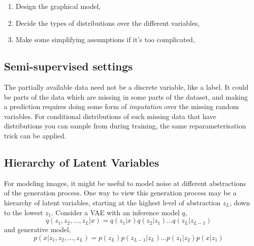 \documentclass{article}
\begin{document}
\begin{enumerate}
\item Design the graphical model,
\item Decide the types of distributions over the different variables,
\item Make some simplifying assumptions if it's too complicated,
\end{enumerate}
\subsection{Semi-supervised settings}



The partially available data need not be a discrete variable, like a label. It could be parts of the data which are missing in some parts of the dataset, and making a prediction requires doing some form of \emph{imputation} over the missing random variables. For conditional distributions of such missing data that have distributions you can sample from during training, the same reparameterisation trick can be applied.


\subsection{Hierarchy of Latent Variables}
For modeling images, it might be useful to model noise at different abstractions of the generation process. One way to view this generation process may be a hierarchy of latent variables, starting at the highest level of abstraction $z_L$, down to the lowest $z_1$.
Consider a VAE with an inference model $q$,
$$q(z_1, z_2,\dots,z_L | x) = q(z_1|x)q(z_2|z_1) \dots q(z_L|z_{L-1})$$
and generative model,
$$p(x|z_1, z_2,\dots,z_L) = p(z_L) p(z_{L-1}|z_L)\dots p(z_1|z_2)p(x|z_1) $$
\end{document}
